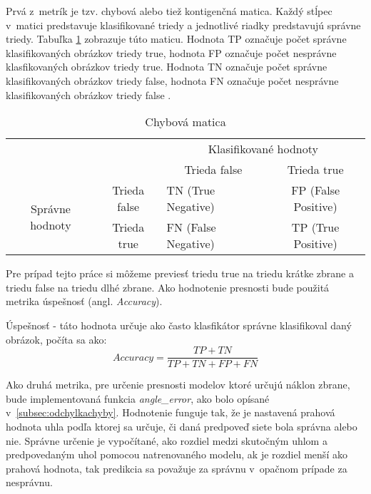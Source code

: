 Prvá z~metrík je tzv. chybová alebo tiež kontigenčná matica.
Každý stĺpec v~matici predstavuje klasifikované triedy a jednotlivé riadky predstavujú správne triedy.
Tabuľka \ref{tab:chybovamatica} zobrazuje túto maticu.
Hodnota TP označuje počet správne klasifikovaných obrázkov triedy true, hodnota FP označuje počet nesprávne klasfikovaných obrázkov triedy true.
Hodnota TN označuje počet správne klasifikovaných obrázkov triedy false, hodnota FN označuje počet nesprávne klasifikovaných obrázkov triedy false \cite{odkaz:ChybovaMatica}.
\begin{table}[H]
    \centering
    \label{tab:chybovamatica}
        \begin{tabular}{lllc}
                                                                &                                   & \multicolumn{2}{c}{Klasifikované hodnoty}                                           \\ \cline{3-4} 
                                                                & \multicolumn{1}{l|}{}             & \multicolumn{1}{c|}{Trieda false}        & \multicolumn{1}{c|}{Trieda true}         \\ \cline{2-4} 
        \multicolumn{1}{c|}{\multirow{2}{*}{Správne hodnoty}} & \multicolumn{1}{c|}{Trieda false} & \multicolumn{1}{l|}{TN (True Negative)}  & \multicolumn{1}{c|}{FP (False Positive)} \\ \cline{2-4} 
        \multicolumn{1}{c|}{}                                 & \multicolumn{1}{c|}{Trieda true}  & \multicolumn{1}{l|}{FN (False Negative)} & \multicolumn{1}{c|}{TP (True Positive)}  \\ \cline{2-4} 
    \end{tabular}
    \caption{Chybová matica}
\end{table}
Pre prípad tejto práce si môžeme previesť triedu true na triedu krátke zbrane a triedu false na triedu dlhé zbrane.
Ako hodnotenie presnosti bude použitá metrika úspešnosť (angl. \textit{Accuracy}).

Úspešnosť - táto hodnota určuje ako často klasfikátor správne klasifikoval daný obrázok, počíta sa ako:
\begin{equation}
    Accuracy = \frac{TP + TN}{TP + TN + FP + FN}
\end{equation}

Ako druhá metrika, pre určenie presnosti modelov ktoré určujú náklon zbrane, bude implementovaná funkcia \textit{angle\_error}, ako bolo opísané v~\ref{subsec:odchylkachyby}.
Hodnotenie funguje tak, že je nastavená prahová hodnota uhla podľa ktorej sa určuje, či daná predpoveď siete bola správna alebo nie.
Správne určenie je vypočítané, ako rozdiel medzi skutočným uhlom a predpovedaným uhol pomocou natrenovaného modelu, ak je rozdiel menší ako prahová hodnota, tak predikcia
    sa považuje za správnu v~opačnom prípade za nesprávnu.

